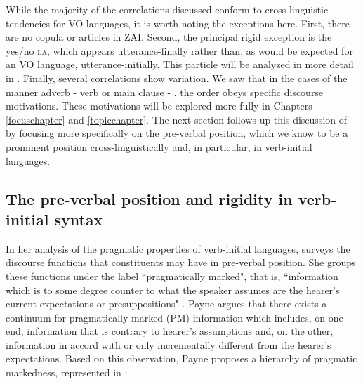While the majority of the  correlations discussed conform to cross-linguistic tendencies for VO languages, it is worth noting the exceptions here. First, there are no copula or articles in ZAI. Second, the principal rigid exception is the yes/no  \textsc{la}, which appears utterance-finally rather than, as would be expected for an VO language, utterance-initially. This particle will be analyzed in more detail in . Finally, several  correlations show variation. We saw that in the cases of the manner adverb - verb or main clause - , the order obeys specific discourse motivations. These motivations will be explored more fully in Chapters \ref{focuschapter} and \ref{topicchapter}. The next section follows up this discussion of  by focusing more specifically on the pre-verbal position, which we know to be a prominent position cross-linguistically and, in particular, in verb-initial languages.


\subsection{The pre-verbal position and rigidity in verb-initial syntax}

In her analysis of the pragmatic properties of verb-initial languages, \citet{payne1995} surveys the discourse functions that constituents may have in pre-verbal position. She groups these functions under the label ``pragmatically marked", that is, ``information which is to some degree counter to what the speaker assumes are the hearer's current expectations or presuppositions" \citep[110]{payne1995}. Payne argues that there exists a continuum for pragmatically marked (PM) information which includes, on one end, information that is contrary to hearer's assumptions and, on the other, information in accord with or only incrementally different from the hearer's expectations. Based on this observation, Payne proposes a hierarchy of pragmatic markedness, represented in :


